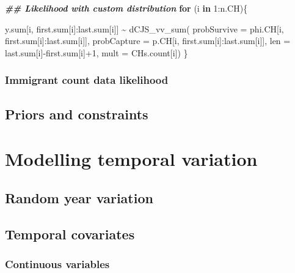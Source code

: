 \documentclass[
]{book}
\newenvironment{Shaded}{\begin{snugshade}}{\end{snugshade}}
\newcommand{\AttributeTok}[1]{\textcolor[rgb]{0.77,0.63,0.00}{#1}}
\newcommand{\ControlFlowTok}[1]{\textcolor[rgb]{0.13,0.29,0.53}{\textbf{#1}}}
\newcommand{\DecValTok}[1]{\textcolor[rgb]{0.00,0.00,0.81}{#1}}
\newcommand{\DocumentationTok}[1]{\textcolor[rgb]{0.56,0.35,0.01}{\textbf{\textit{#1}}}}
\newcommand{\FunctionTok}[1]{\textcolor[rgb]{0.00,0.00,0.00}{#1}}
\newcommand{\NormalTok}[1]{#1}
\newcommand{\SpecialCharTok}[1]{\textcolor[rgb]{0.00,0.00,0.00}{#1}}
\begin{document}
\begin{Shaded}
\begin{Highlighting}[]
\DocumentationTok{\#\# Likelihood with custom distribution}
\ControlFlowTok{for}\NormalTok{ (i }\ControlFlowTok{in} \DecValTok{1}\SpecialCharTok{:}\NormalTok{n.CH)\{}

\NormalTok{  y.sum[i, first.sum[i]}\SpecialCharTok{:}\NormalTok{last.sum[i]] }\SpecialCharTok{\textasciitilde{}} \FunctionTok{dCJS\_vv\_sum}\NormalTok{(}
      \AttributeTok{probSurvive =}\NormalTok{ phi.CH[i, first.sum[i]}\SpecialCharTok{:}\NormalTok{last.sum[i]],}
      \AttributeTok{probCapture =}\NormalTok{ p.CH[i, first.sum[i]}\SpecialCharTok{:}\NormalTok{last.sum[i]],}
      \AttributeTok{len =}\NormalTok{ last.sum[i]}\SpecialCharTok{{-}}\NormalTok{first.sum[i]}\SpecialCharTok{+}\DecValTok{1}\NormalTok{,}
      \AttributeTok{mult =}\NormalTok{ CHs.count[i])}
\NormalTok{    \}}
\end{Highlighting}
\end{Shaded}

\hypertarget{immigrant-count-data-likelihood}{%
\subsection{Immigrant count data likelihood}\label{immigrant-count-data-likelihood}}

\hypertarget{priors-and-constraints}{%
\section{Priors and constraints}\label{priors-and-constraints}}

\hypertarget{TempVar}{%
\chapter{Modelling temporal variation}\label{TempVar}}

\hypertarget{random-year-variation}{%
\section{Random year variation}\label{random-year-variation}}

\hypertarget{temporal-covariates}{%
\section{Temporal covariates}\label{temporal-covariates}}

\hypertarget{continuous-variables}{%
\subsection{Continuous variables}\label{continuous-variables}}
\end{document}
